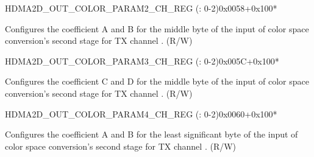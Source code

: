 \begin{register}{H}{DMA2D\_OUT\_COLOR\_PARAM2\_CH\_REG (: 0-2)}{0x0058+0x100*}\label{regdesc:DMA2DOUTCOLORPARAM2CHNREG}
%
%
\regnewline%
\begin{regdesc}\begin{reglist}
\label{fielddesc:DMA2DOUTCOLORPARAMM0CHN}\item [DMA2D\_OUT\_COLOR\_PARAM\_M0\_CH\regindex{n}] Configures the coefficient A and B for the middle byte of the input of color space conversion's second stage for TX channel . (R/W)
\end{reglist}\end{regdesc}
\end{register}


\begin{register}{H}{DMA2D\_OUT\_COLOR\_PARAM3\_CH\_REG (: 0-2)}{0x005C+0x100*}\label{regdesc:DMA2DOUTCOLORPARAM3CHNREG}
%
%
\regnewline%
\begin{regdesc}\begin{reglist}
\label{fielddesc:DMA2DOUTCOLORPARAMM1CHN}\item [DMA2D\_OUT\_COLOR\_PARAM\_M1\_CH\regindex{n}] Configures the coefficient C and D for the middle byte of the input of color space conversion's second stage for TX channel . (R/W)
\end{reglist}\end{regdesc}
\end{register}


\begin{register}{H}{DMA2D\_OUT\_COLOR\_PARAM4\_CH\_REG (: 0-2)}{0x0060+0x100*}\label{regdesc:DMA2DOUTCOLORPARAM4CHNREG}
%
%
\regnewline%
\begin{regdesc}\begin{reglist}
\label{fielddesc:DMA2DOUTCOLORPARAML0CHN}\item [DMA2D\_OUT\_COLOR\_PARAM\_L0\_CH\regindex{n}] Configures the coefficient A and B for the least significant byte of the input of color space conversion's second stage for TX channel . (R/W)
\end{reglist}\end{regdesc}
\end{register}



